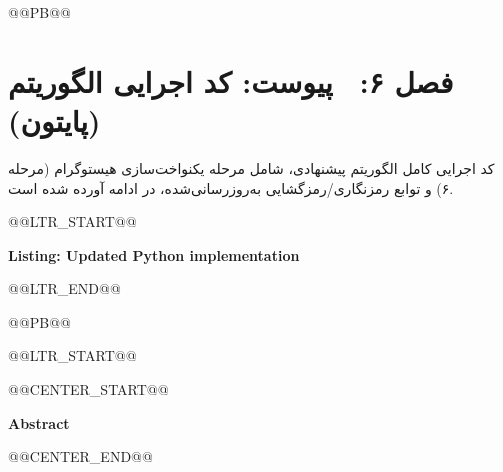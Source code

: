 @@PB@@







\chapter{فصل ۶:  پیوست: کد اجرایی الگوریتم (پایتون)}
\label{ch:appendix_code}

کد اجرایی کامل الگوریتم پیشنهادی، شامل مرحله یکنواخت‌سازی هیستوگرام (مرحله ۶) و توابع رمزنگاری/رمزگشایی به‌روزرسانی‌شده، در ادامه آورده شده است.

@@LTR_START@@

\noindent\textbf{Listing: Updated Python implementation}
\label{lst:appendix-code}


@@LTR_END@@

@@PB@@

@@LTR_START@@

@@CENTER_START@@


    {\Large \textbf{Abstract}}


@@CENTER_END@@


\vspace{0.5cm}

